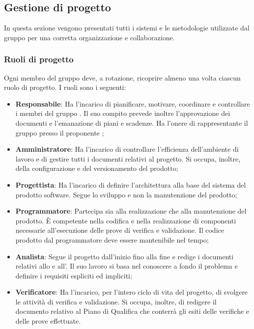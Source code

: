 \subsection{Gestione di progetto}
In questa sezione vengono presentati tutti i sistemi e le metodologie utilizzate dal gruppo per una corretta organizzazione e collaborazione.
\subsubsection{Ruoli di progetto}
Ogni membro del gruppo deve, a rotazione, ricoprire almeno una volta ciascun ruolo di progetto.
I ruoli sono i seguenti:
\begin{itemize}
\item \textbf{Responsabile}: Ha l'incarico di pianificare, motivare, coordinare e controllare i membri del gruppo \Gruppo{}.
Il suo compito prevede inoltre l'approvazione dei documenti e l'emanazione di piani e scadenze.
Ha l'onere di rappresentante il gruppo presso il proponente \Proponente{};
\item \textbf{Amministratore}: Ha l'incarico di controllare l'efficienza dell'ambiente di lavoro e di gestire tutti i documenti relativi al progetto.
Si occupa, inoltre, della configurazione e del versionamento del prodotto;
\item \textbf{Progettista}: Ha l'incarico di definire l'architettura alla base del sistema del prodotto software.
Segue lo sviluppo e non la manutenzione del prodotto;
\item \textbf{Programmatore}: Partecipa sia alla realizzazione che alla manutenzione del prodotto.
È competente nella codifica e nella realizzazione di componenti necessarie all’esecuzione delle prove di verifica e validazione.
Il codice prodotto dal programmatore deve essere mantenibile nel tempo;
\item \textbf{Analista}: Segue il progetto dall'inizio fino alla fine e redige i documenti relativi allo \SdF{} e all'\AdR{}.
Il suo lavoro si basa nel conoscere a fondo il problema e definire i requisiti espliciti ed impliciti;
\item \textbf{Verificatore}: Ha l'incarico, per l'intero ciclo di vita del progetto, di svolgere le attività di verifica e validazione.
Si occupa, inoltre, di redigere il documento relativo al Piano di Qualifica che conterrà gli esiti delle verifiche e delle prove effettuate.
\end{itemize}

